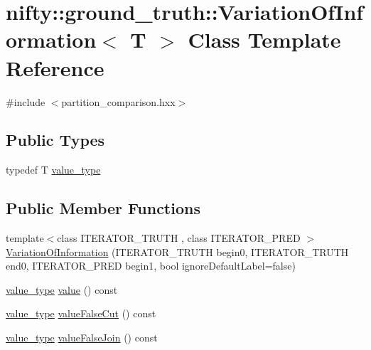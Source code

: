 \hypertarget{classnifty_1_1ground__truth_1_1VariationOfInformation}{}\section{nifty\+:\+:ground\+\_\+truth\+:\+:Variation\+Of\+Information$<$ T $>$ Class Template Reference}
\label{classnifty_1_1ground__truth_1_1VariationOfInformation}


{\ttfamily \#include $<$partition\+\_\+comparison.\+hxx$>$}

\subsection*{Public Types}
\begin{DoxyCompactItemize}
\item 
typedef T \hyperlink{classnifty_1_1ground__truth_1_1VariationOfInformation_ad0f4a205d57087c7641664b76410e40c}{value\+\_\+type}
\end{DoxyCompactItemize}
\subsection*{Public Member Functions}
\begin{DoxyCompactItemize}
\item 
{\footnotesize template$<$class I\+T\+E\+R\+A\+T\+O\+R\+\_\+\+T\+R\+U\+TH , class I\+T\+E\+R\+A\+T\+O\+R\+\_\+\+P\+R\+ED $>$ }\\\hyperlink{classnifty_1_1ground__truth_1_1VariationOfInformation_a3b6f86e4d5d3d98fe0dacb5ec2a1c2df}{Variation\+Of\+Information} (I\+T\+E\+R\+A\+T\+O\+R\+\_\+\+T\+R\+U\+TH begin0, I\+T\+E\+R\+A\+T\+O\+R\+\_\+\+T\+R\+U\+TH end0, I\+T\+E\+R\+A\+T\+O\+R\+\_\+\+P\+R\+ED begin1, bool ignore\+Default\+Label=false)
\item 
\hyperlink{classnifty_1_1ground__truth_1_1VariationOfInformation_ad0f4a205d57087c7641664b76410e40c}{value\+\_\+type} \hyperlink{classnifty_1_1ground__truth_1_1VariationOfInformation_acad027a7f846032110241c3d842f5e06}{value} () const
\item 
\hyperlink{classnifty_1_1ground__truth_1_1VariationOfInformation_ad0f4a205d57087c7641664b76410e40c}{value\+\_\+type} \hyperlink{classnifty_1_1ground__truth_1_1VariationOfInformation_a4a46e97abc7c487a2459e06c27349596}{value\+False\+Cut} () const
\item 
\hyperlink{classnifty_1_1ground__truth_1_1VariationOfInformation_ad0f4a205d57087c7641664b76410e40c}{value\+\_\+type} \hyperlink{classnifty_1_1ground__truth_1_1VariationOfInformation_a2e8e4911485c710468708adfcc5c67e9}{value\+False\+Join} () const
\end{DoxyCompactItemize}



